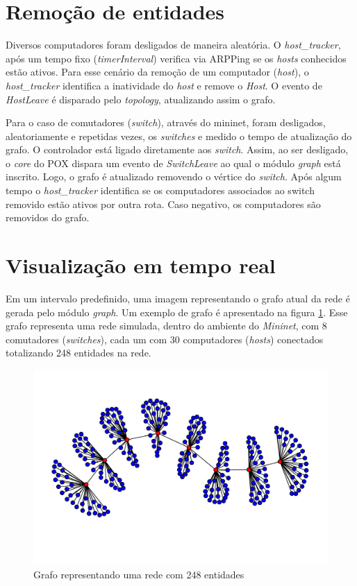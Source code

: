 \section{Remoção de entidades}

Diversos computadores foram desligados de maneira aleatória.
O \emph{host\_tracker}, após um tempo fixo (\emph{timerInterval}) 
verifica via ARPPing se os \emph{hosts} conhecidos estão ativos.
Para esse cenário da remoção de um computador (\emph{host}), 
o \emph{host\_tracker} identifica a inatividade do \emph{host} e remove o 
\emph{Host}.
O evento de \emph{HostLeave} é disparado pelo \emph{topology}, 
atualizando assim o grafo.

Para o caso de comutadores (\emph{switch}), através do mininet, foram 
desligados, aleatoriamente e repetidas vezes, os \emph{switches} e medido 
o tempo de atualização do grafo.
O controlador está ligado diretamente aos \emph{switch}. 
Assim, ao ser desligado, o \emph{core} do POX dispara um evento 
de \emph{SwitchLeave} ao qual o módulo \emph{graph} está inscrito. 
Logo, o grafo é atualizado removendo o vértice do \emph{switch}. 
Após algum tempo o \emph{host\_tracker} identifica se os computadores 
associados ao switch removido estão ativos por outra rota. 
Caso negativo, os computadores são removidos do grafo.

\section{Visualização em tempo real}

Em um intervalo predefinido, uma imagem representando o grafo atual da rede
é gerada pelo módulo \emph{graph}.
Um exemplo de grafo é apresentado na figura \ref{fig:full-graph}.
Esse grafo representa uma rede simulada, dentro do ambiente do 
\emph{Mininet}, com 8 comutadores (\emph{switches}), cada um com 30 
computadores (\emph{hosts}) conectados totalizando 248 entidades na rede.


\begin{figure}[h!]
    \centering
    \includegraphics[width=\textwidth]{img/full-graph}
    \caption{Grafo representando uma rede com 248 entidades}
    \label{fig:full-graph}
\end{figure}

